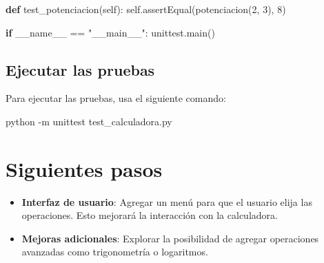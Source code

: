 \documentclass[
  a4paper,
  DIV=11,
  numbers=noendperiod,
  onepage,
  openany]{scrreprt}
\newenvironment{Shaded}{\begin{snugshade}}{\end{snugshade}}
\newcommand{\AttributeTok}[1]{\textcolor[rgb]{0.40,0.45,0.13}{#1}}
\newcommand{\ControlFlowTok}[1]{\textcolor[rgb]{0.00,0.23,0.31}{\textbf{#1}}}
\newcommand{\DecValTok}[1]{\textcolor[rgb]{0.68,0.00,0.00}{#1}}
\newcommand{\ExtensionTok}[1]{\textcolor[rgb]{0.00,0.23,0.31}{#1}}
\newcommand{\KeywordTok}[1]{\textcolor[rgb]{0.00,0.23,0.31}{\textbf{#1}}}
\newcommand{\NormalTok}[1]{\textcolor[rgb]{0.00,0.23,0.31}{#1}}
\newcommand{\OperatorTok}[1]{\textcolor[rgb]{0.37,0.37,0.37}{#1}}
\newcommand{\StringTok}[1]{\textcolor[rgb]{0.13,0.47,0.30}{#1}}
\newcommand{\VariableTok}[1]{\textcolor[rgb]{0.07,0.07,0.07}{#1}}
\providecommand{\tightlist}{%
  \setlength{\itemsep}{0pt}\setlength{\parskip}{0pt}}\usepackage{longtable,booktabs,array}
\begin{document}
\begin{Shaded}
\begin{Highlighting}[]
    \KeywordTok{def}\NormalTok{ test\_potenciacion(}\VariableTok{self}\NormalTok{):}
        \VariableTok{self}\NormalTok{.assertEqual(potenciacion(}\DecValTok{2}\NormalTok{, }\DecValTok{3}\NormalTok{), }\DecValTok{8}\NormalTok{)}

\ControlFlowTok{if} \VariableTok{\_\_name\_\_} \OperatorTok{==} \StringTok{"\_\_main\_\_"}\NormalTok{:}
\NormalTok{    unittest.main()}
\end{Highlighting}
\end{Shaded}

\subsection{Ejecutar las pruebas}\label{ejecutar-las-pruebas}

Para ejecutar las pruebas, usa el siguiente comando:

\begin{Shaded}
\begin{Highlighting}[]
\ExtensionTok{python} \AttributeTok{{-}m}\NormalTok{ unittest test\_calculadora.py}
\end{Highlighting}
\end{Shaded}

\section{Siguientes pasos}\label{siguientes-pasos}

\begin{itemize}
\tightlist
\item
  \textbf{Interfaz de usuario}: Agregar un menú para que el usuario
  elija las operaciones. Esto mejorará la interacción con la
  calculadora.
\item
  \textbf{Mejoras adicionales}: Explorar la posibilidad de agregar
  operaciones avanzadas como trigonometría o logaritmos.
\end{itemize}
\end{document}
